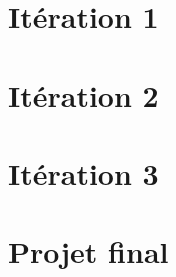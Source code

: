     \chapter{Itération 1}

    

    \normalsize
    \chapter{Itération 2}

    

    \chapter{Itération 3}


    

    \chapter{Projet final}

    